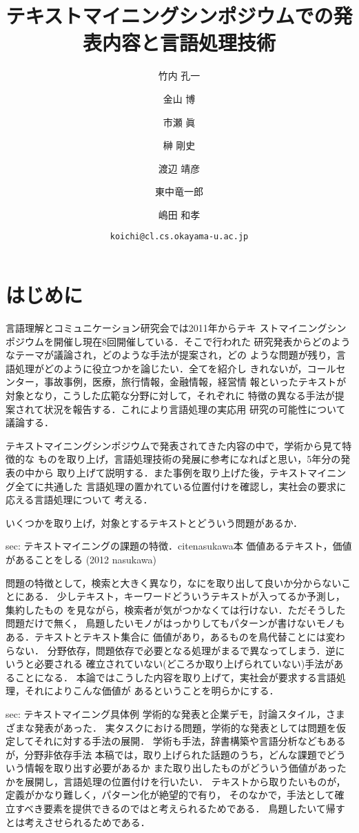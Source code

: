 \documentclass[twocolumn]{jarticle}
\title{\textbf{テキストマイニングシンポジウムでの発表内容と言語処理技術}}
\author{
竹内 孔一 \and  金山 博 \and 市瀬 眞 \and 榊 剛史 \and
渡辺 靖彦 \and  東中竜一郎 \and 嶋田 和孝   }
\date{\texttt{koichi@cl.cs.okayama-u.ac.jp}}
\begin{document}
\maketitle


\section{はじめに} 
言語理解とコミュニケーション研究会では2011年からテキ
ストマイニングシンポジウムを開催し現在8回開催している．そこで行われた
研究発表からどのようなテーマが議論され，どのような手法が提案され，どの
ような問題が残り，言語処理がどのように役立つかを論じたい．全てを紹介し
きれないが，コールセンター，事故事例，医療，旅行情報，金融情報，経営情
報といったテキストが対象となり，こうした広範な分野に対して，それぞれに
特徴の異なる手法が提案されて状況を報告する．これにより言語処理の実応用
研究の可能性について議論する．




テキストマイニングシンポジウムで発表されてきた内容の中で，学術から見て特徴的な
ものを取り上げ，言語処理技術の発展に参考になればと思い，5年分の発表の中から
取り上げて説明する．また事例を取り上げた後，テキストマイニング全てに共通した
言語処理の置かれている位置付けを確認し，実社会の要求に応える言語処理について
考える．


いくつかを取り上げ，対象とするテキストとどういう問題があるか．

sec: テキストマイニングの課題の特徴．cite{nasukawa本}
価値あるテキスト，価値があることをしる (2012 nasukawa)

問題の特徴として，検索と大きく異なり，なにを取り出して良いか分からないことにある．
少しテキスト，キーワードどういうテキストが入ってるか予測し，集約したもの
を見ながら，検索者が気がつかなくては行けない．ただそうした問題だけで無く，
鳥題したいモノがはっかりしてもパターンが書けないモノもある．テキストとテキスト集合に
価値があり，あるものを鳥代替ことには変わらない．
分野依存，問題依存で必要となる処理がまるで異なってしまう．逆にいうと必要される
確立されていない(どころか取り上げられていない)手法があることになる．
本論ではこうした内容を取り上げて，実社会が要求する言語処理，それによりこんな価値が
あるということを明らかにする．

sec: テキストマイニング具体例
学術的な発表と企業デモ，討論スタイル，さまざまな発表があった．
実タスクにおける問題，学術的な発表としては問題を仮定してそれに対する手法の展開．
学術も手法，辞書構築や言語分析などもあるが，分野非依存手法
本稿では，取り上げられた話題のうち，どんな課題でどういう情報を取り出す必要があるか
また取り出したものがどういう価値があったかを展開し，言語処理の位置付けを行いたい．
テキストから取りたいものが，定義がかなり難しく，パターン化が絶望的で有り，
そのなかで，手法として確立すべき要素を提供できるのではと考えられるためである．
鳥題したいて帰すとは考えさせられるためである．
\end{document}
